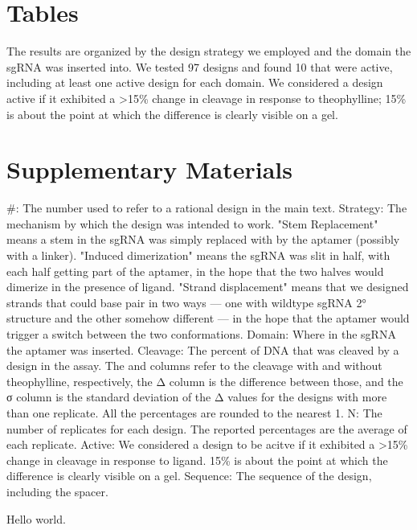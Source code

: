 \documentclass[10pt,oneside]{article}
\begin{document}






\section{Tables}



   The results are organized by 
 the design strategy we employed and the domain the sgRNA was inserted into.  
 We tested 97 designs and found 10 that were active, including at least one 
 active design for each domain.  We considered a design active if it exhibited 
 a >15\% change in cleavage in response to theophylline; 15\% is about the 
 point at which the difference is clearly visible on a gel.

\section{Supplementary Materials}



 \#: The number used to refer to a rational design in the main text.
 Strategy: The mechanism by which the design was intended to work.  "Stem 
 Replacement" means a stem in the sgRNA was simply replaced with by the aptamer 
 (possibly with a linker).  "Induced dimerization" means the sgRNA was slit in 
 half, with each half getting part of the aptamer, in the hope that the two 
 halves would dimerize in the presence of ligand.  "Strand displacement" means 
 that we designed strands that could base pair in two ways --- one with wildtype 
 sgRNA 2° structure and the other somehow different --- in the hope that the 
 aptamer would trigger a switch between the two conformations.
 Domain: Where in the sgRNA the aptamer was inserted.  
 Cleavage: The percent of DNA that was cleaved by a design in the \invitro{} 
 assay.  The \apo{} and \holo{} columns refer to the cleavage with and without 
 theophylline, respectively, the Δ column is the difference between those, and 
 the σ column is the standard deviation of the Δ values for the designs with 
 more than one replicate.  All the percentages are rounded to the nearest 1.
 N: The number of replicates for each design.  The reported percentages are the 
 average of each replicate.
 Active: We considered a design to be acitve if it exhibited a >15\% change in 
 cleavage in response to ligand.  15\% is about the point at which the 
 difference is clearly visible on a gel.
 Sequence: The sequence of the design, including the spacer.



 Hello world.

\printbibliography[title=References]
\end{document}

